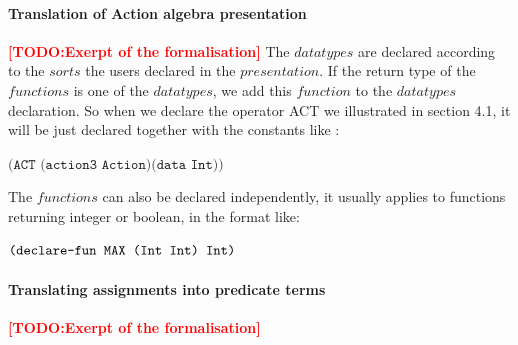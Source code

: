 \documentclass{lncs/llncs}
\newcommand{\TODO}[1]{\textcolor{red}{\textbf{[TODO:#1]}}}
\newcommand{\OTvar}{\texttt}
\begin{document}
\paragraph{Translation of Action algebra presentation}
\TODO{Exerpt of the formalisation}
The $datatypes$ are declared according to the $sorts$ the users
declared in the $presentation$. If the return type of the $functions$
is one of the $datatypes$, we add this $function$ to the $datatypes$ declaration.
So when we declare the operator ACT we illustrated in section 4.1, it
will be just declared together with the constants like :\\
\centerline{$\OTvar{(ACT\ (action3\ Action)(data\ Int))}$}

The $functions$ can also be declared independently, it usually applies to functions returning integer or boolean, in the format like:\\
\centerline{$\OTvar{(declare\text{-}fun\ MAX\ (Int\ Int)\ Int)}$}

%
%
%

\paragraph{Translating assignments into predicate terms}
\TODO{Exerpt of the formalisation}

\end{document}
